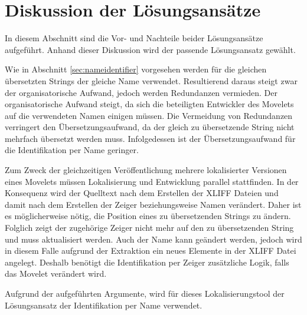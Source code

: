 \section{Diskussion der Lösungsansätze}
In diesem Abschnitt sind die Vor- und Nachteile beider Lösungsansätze aufgeführt. Anhand dieser Diskussion wird der passende Lösungsansatz gewählt.
\par
Wie in Abschnitt \ref{sec:nameidentifier} vorgesehen werden für die gleichen übersetzten Strings der gleiche Name verwendet. Resultierend daraus steigt zwar der organisatorische Aufwand, jedoch werden Redundanzen vermieden. Der organisatorische Aufwand steigt, da sich die beteiligten Entwickler des Movelets auf die verwendeten Namen einigen müssen. Die Vermeidung von Redundanzen verringert den Übersetzungsaufwand, da der gleich zu übersetzende String nicht mehrfach übersetzt werden muss. Infolgedessen ist der Übersetzungsaufwand für die Identifikation per Name geringer.
\par
Zum Zweck der gleichzeitigen Veröffentlichung mehrere lokalisierter Versionen eines Movelets müssen Lokalisierung und Entwicklung parallel stattfinden. In der Konsequenz wird der Quelltext nach dem Erstellen der \ac{XLIFF} Dateien und damit nach dem Erstellen der Zeiger beziehungsweise Namen verändert. Daher ist es möglicherweise nötig, die Position eines zu übersetzenden Strings zu ändern. Folglich zeigt der zugehörige Zeiger nicht mehr auf den zu übersetzenden String und muss aktualisiert werden. Auch der Name kann geändert werden, jedoch wird in diesem Falle aufgrund der Extraktion ein neues Elemente in der \ac{XLIFF} Datei angelegt. Deshalb benötigt die Identifikation per Zeiger zusätzliche Logik, falls das Movelet verändert wird.
\par
Aufgrund der aufgeführten Argumente, wird für dieses Lokalisierungstool der Lösungsansatz der Identifikation per Name verwendet.